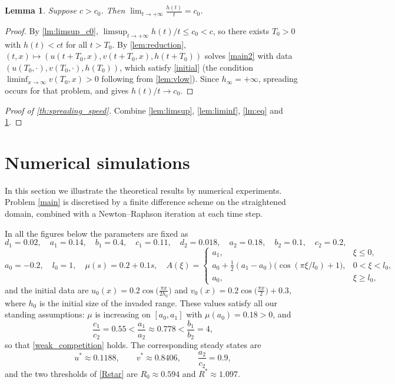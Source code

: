 \documentclass[reqno]{amsart}
\theoremstyle{plain}
\newtheorem{lemma}[theorem]{Lemma}
\theoremstyle{definition}
\theoremstyle{remark}
\begin{document}
\begin{lemma}\label{lm:g}
	Suppose $c > c_0$. Then $\displaystyle\lim_{t\to+\infty} \frac{h(t)}{t} = c_0$.
\end{lemma}

\begin{proof}
	By \cref{lm:limsup_c0}, $\limsup_{t\to+\infty}h(t)/t\le c_0<c$, so there
	exists $T_0>0$ with $h(t)<ct$ for all $t>T_0$. By \cref{lem:reduction},
	$(t,x)\mapsto(u(t+T_0,x),v(t+T_0,x),h(t+T_0))$ solves \eqref{main2} with data
	$(u(T_0,\cdot),v(T_0,\cdot),h(T_0))$, which satisfy \eqref{initial} (the
	condition $\liminf_{x\to\infty}v(T_0,x)>0$ following from \cref{lem:vlow}).
	Since $h_\infty=+\infty$, spreading occurs for that problem, and
	\cite[Theorem 1.3]{MR3986328} gives $h(t)/t\to c_0$.
\end{proof}

\begin{proof}[Proof of \cref{th:spreading_speed}]
	Combine \cref{lem:limsup}, \cref{lem:liminf}, \cref{lm:eq} and \cref{lm:g}.
\end{proof}

\section{Numerical simulations}\label{sec_7}

In this section we illustrate the theoretical results by numerical experiments.
Problem \eqref{main} is discretised by a finite difference scheme on the
straightened domain, combined with a Newton--Raphson iteration at each time step.

In all the figures below the parameters are fixed as
\[
d_1 = 0.02,\quad a_1 = 0.14,\quad b_1 = 0.4,\quad c_1 = 0.11,\quad
d_2 = 0.018,\quad a_2 = 0.18,\quad b_2 = 0.1,\quad c_2 = 0.2,
\]
\[
a_0 = -0.2,\quad l_0 = 1,\quad \mu(s) = 0.2 + 0.1s,\quad
A(\xi) = \begin{cases}
	a_1, & \xi \le 0, \\
	a_0 + \frac{1}{2} (a_1 - a_0)\big(\cos( \pi \xi / l_0 ) + 1\big), & 0 < \xi < l_0, \\
	a_0, & \xi \ge l_0,
\end{cases}
\]
and the initial data are
$u_0(x) = 0.2 \cos\big(\frac{\pi x}{2h_0}\big)$ and
$v_0(x) = 0.2 \cos\big(\frac{\pi x}{2}\big) + 0.3$, where $h_0$ is the initial
size of the invaded range. These values satisfy all our standing assumptions:
$\mu$ is increasing on $[a_0,a_1]$ with $\mu(a_0)=0.18>0$, and
\[
\frac{c_1}{c_2} = 0.55 < \frac{a_1}{a_2}\approx0.778 < \frac{b_1}{b_2} = 4,
\]
so that \eqref{weak_competition} holds. The corresponding steady states are
\[
u^*\approx0.1188,\qquad v^*\approx0.8406,\qquad \frac{a_2}{c_2}=0.9,
\]
and the two thresholds of \eqref{Rstar} are $R_0\approx0.594$ and
$R^*\approx1.097$.
\end{document}
